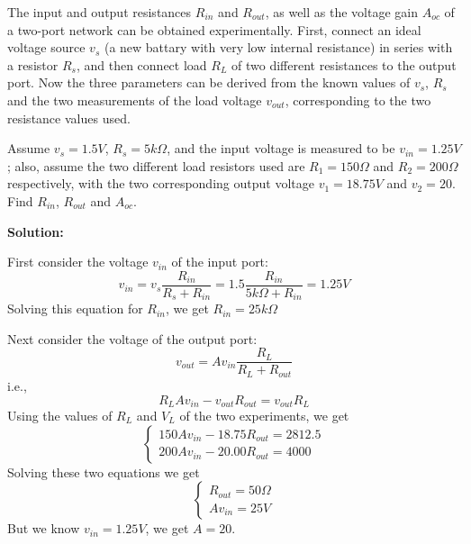 \usepackage{html}



  The input and output resistances $R_{in}$ and $R_{out}$, as well as the voltage 
  gain $A_{oc}$ of a two-port network can be obtained experimentally. First,
  connect an ideal voltage source $v_s$ (a new battary with very low internal
  resistance) in series with a resistor $R_s$, and then connect load $R_L$ of
  two different resistances to the output port. Now the three parameters can
  be derived from the known values of $v_s$, $R_s$ and the two measurements of
  the load voltage $v_{out}$, corresponding to the two resistance values used.

  Assume $v_s=1.5V$, $R_s=5 k\Omega$, and the input voltage is measured to be 
  $v_{in}=1.25 V$; also, assume the two different load resistors used are 
  $R_1=150 \Omega$ and $R_2=200 \Omega$ respectively, with the two corresponding
  output voltage $v_1=18.75V$ and $v_2=20$. Find $R_{in}$, $R_{out}$ and $A_{oc}$.


  {\bf Solution:}

  First consider the voltage $v_{in}$ of the input port:
  \[ v_{in}=v_s \frac{R_{in}}{R_s+R_{in}}
  =1.5 \frac{R_{in}}{5 k\Omega +R_{in}}=1.25 V \]
  Solving this equation for $R_{in}$, we get $R_{in}=25 k\Omega$

  Next consider the voltage of the output port:
  \[ v_{out}=A v_{in} \frac{R_L}{R_L+R_{out}} \]
  i.e., 
  \[ R_L A v_{in}-v_{out} R_{out} = v_{out} R_L \]
  Using the values of $R_L$ and $V_L$ of the two experiments, we get
  \[ \left\{ \begin{array}{l} 
    150 Av_{in}-18.75 R_{out} = 2812.5 \\
    200 Av_{in}-20.00 R_{out} = 4000 \end{array} \right. \]
  Solving these two equations we get
  \[ \left\{ \begin{array}{l} 
    R_{out}=50 \Omega \\ Av_{in}=25 V \end{array} \right. \]
  But we know $v_{in}=1.25 V$, we get $A=20$.  







